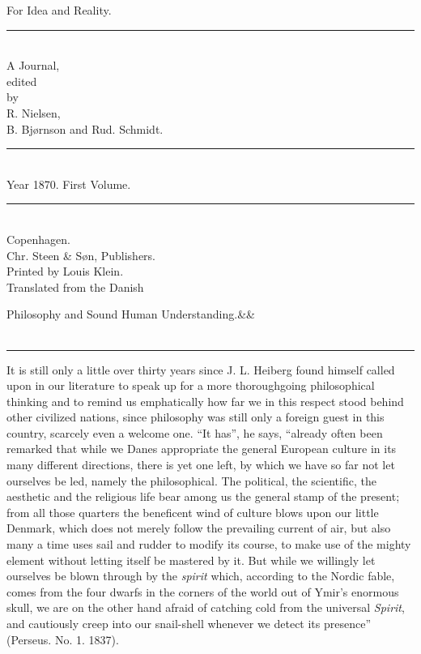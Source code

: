 \documentclass[12pt,a4paper,openany]{book}
\newcommand{\opage}[1]{\marginnote{\footnotesize\textit{[#1]}}}
\newcommand{\essayhead}[2]{\begin{center}{\large #1}\ifx&#2&\else\\[0.3em]{\normalsize #2}\fi\\[0.5em]\rule{3em}{0.4pt}\end{center}\medskip\noindent}
\begin{document}
\begin{titlepage}
\begin{center}
\vspace*{3em}
{\Huge For Idea and Reality.}\\[1em]
\rule{8em}{0.4pt}\\[1em]
{\large A Journal,}\\[0.8em]
{\small edited}\\[0.4em]
{\footnotesize by}\\[0.6em]
{\large R. Nielsen,}\\[0.4em]
{\large B. Bjørnson and Rud. Schmidt.}\\[1em]
\rule{8em}{0.4pt}\\[0.6em]
{\large Year 1870. First Volume.}\\[0.6em]
\rule{8em}{0.4pt}\\[4em]
Copenhagen.\\[0.4em]
Chr. Steen \& Søn, Publishers.\\[1.5em]
{\small Printed by Louis Klein.}\\[3em]
{\small Translated from the Danish}
\end{center}
\end{titlepage}

\essayhead{Philosophy and Sound Human Understanding.}{}
\setcounter{footnote}{0}%
\opage{385}It is still only a little over thirty years since J.
L. Heiberg found himself called upon in our literature to
speak up for a more thoroughgoing philosophical thinking
and to remind us emphatically how far we in this
respect stood behind other civilized nations,
since philosophy was still only a foreign guest in this country, scarcely
even a welcome one. ``It has'',
he says, ``already often been remarked that
while we Danes appropriate the general European
culture in its many different directions, there is yet
one left, by which we have so far not let
ourselves be led, namely the philosophical. The political, the scientific,
the aesthetic and the religious life bear
among us the general stamp of the present; from all those quarters
the beneficent wind of culture blows upon our little Denmark,
which does not merely follow the prevailing
current of air, but also many a time uses sail and
rudder to modify its course, to make use of the
mighty element without letting itself be mastered by it.
But while we willingly let ourselves be blown through by the \emph{spirit}
which, according to the Nordic fable, comes from the four dwarfs
\setcounter{footnote}{0}%
\opage{386}in the corners of the world out of Ymir's enormous skull, we
are on the other hand afraid of catching cold from the universal \emph{Spirit},
and cautiously creep into our snail-shell whenever we detect
its presence'' (Perseus. No. 1. 1837).
\end{document}
